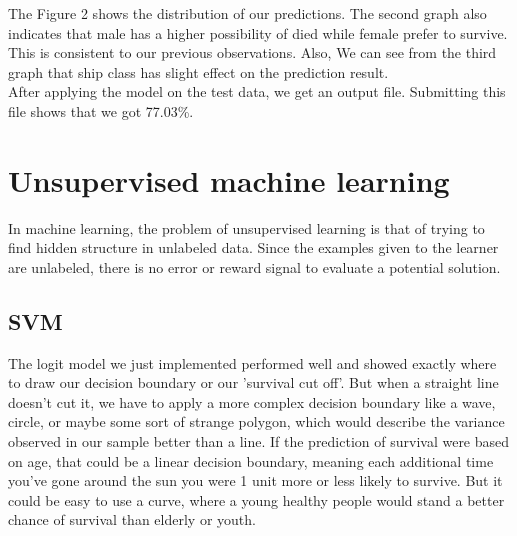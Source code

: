 \documentclass{article}
\begin{document}
The Figure 2 shows the distribution of our predictions. The second graph also indicates that male has a higher possibility of died while female prefer to survive. This is consistent to our previous observations. Also, We can see from the third graph that ship class has slight effect on the prediction result. \\

After applying the model on the test data, we get an output file. Submitting this file shows that we got 77.03\%.




\section{Unsupervised machine learning}
In machine learning, the problem of unsupervised learning is that of trying to find hidden structure in unlabeled data. Since the examples given to the learner are unlabeled, there is no error or reward signal to evaluate a potential solution. 


\subsection{SVM}

The logit model we just implemented performed well and showed exactly where to draw our decision boundary or our 'survival cut off'. But when a straight line doesn't cut it, we have to apply a more complex decision boundary like a wave, circle, or maybe some sort of strange polygon, which would describe the variance observed in our sample better than a line. If the prediction of survival were based on age, that could be a linear decision boundary, meaning each additional time you've gone around the sun you were 1 unit more or less likely to survive. But it could be easy to use a curve, where a young healthy people would stand a better  chance of survival than elderly or youth. \\
\end{document}
